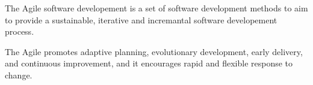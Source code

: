 The Agile software developement is a set of software development methods
to aim to provide a sustainable, iterative and incremantal software developement
process.

The Agile promotes adaptive planning, evolutionary development, early delivery,
and continuous improvement, and it encourages rapid and flexible response to change. \cite{}
